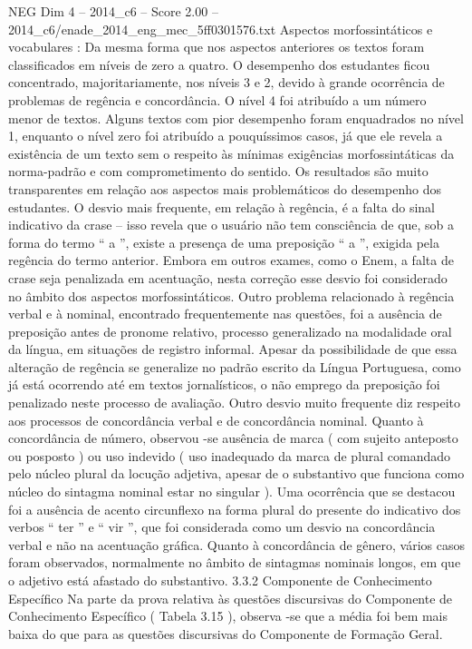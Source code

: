\begin{textsample}{NEG Dim 4 – 2014\_c6 – Score 2.00 – 2014\_c6/enade\_2014\_eng\_mec\_5ff0301576.txt}
Aspectos morfossintáticos e vocabulares : Da mesma forma que nos aspectos anteriores os textos foram classificados em níveis de zero a quatro.
O desempenho dos estudantes ficou concentrado, majoritariamente, nos níveis 3 e 2, devido à grande ocorrência de problemas de regência e concordância.
O nível 4 foi atribuído a um número menor de textos.
Alguns textos com pior desempenho foram enquadrados no nível 1, enquanto o nível zero foi atribuído a pouquíssimos casos, já que ele revela a existência de um texto sem o respeito às mínimas exigências morfossintáticas da norma-padrão e com comprometimento do sentido.
Os resultados são muito transparentes em relação aos aspectos mais problemáticos do desempenho dos estudantes.
O desvio mais frequente, em relação à regência, é a falta do sinal indicativo da crase – isso revela que o usuário não tem consciência de que, sob a forma do termo “ a ”, existe a presença de uma preposição “ a ”, exigida pela regência do termo anterior.
Embora em outros exames, como o Enem, a falta de crase seja penalizada em acentuação, nesta correção esse desvio foi considerado no âmbito dos aspectos morfossintáticos.
Outro problema relacionado à regência verbal e à nominal, encontrado frequentemente nas questões, foi a ausência de preposição antes de pronome relativo, processo generalizado na modalidade oral da língua, em situações de registro informal.
Apesar da possibilidade de que essa alteração de regência se generalize no padrão escrito da Língua Portuguesa, como já está ocorrendo até em textos jornalísticos, o não emprego da preposição foi penalizado neste processo de avaliação.
Outro desvio muito frequente diz respeito aos processos de concordância verbal e de concordância nominal.
Quanto à concordância de número, observou -se ausência de marca ( com sujeito anteposto ou posposto ) ou uso indevido ( uso inadequado da marca de plural comandado pelo núcleo plural da locução adjetiva, apesar de o substantivo que funciona como núcleo do sintagma nominal estar no singular ).
Uma ocorrência que se destacou foi a ausência de acento circunflexo na forma plural do presente do indicativo dos verbos “ ter ” e “ vir ”, que foi considerada como um desvio na concordância verbal e não na acentuação gráfica.
Quanto à concordância de gênero, vários casos foram observados, normalmente no âmbito de sintagmas nominais longos, em que o adjetivo está afastado do substantivo. 3.3.2 Componente de Conhecimento Específico Na parte da prova relativa às questões discursivas do Componente de Conhecimento Específico ( Tabela 3.15 ), observa -se que a média foi bem mais baixa do que para as questões discursivas do Componente de Formação Geral.

\end{textsample}
